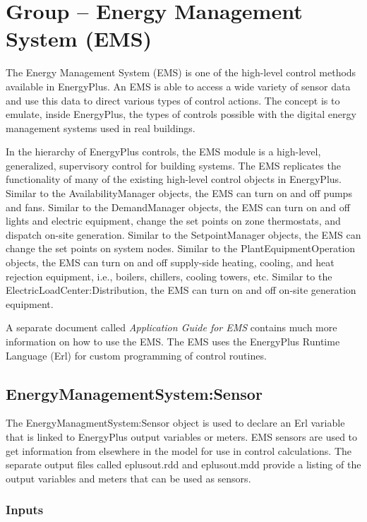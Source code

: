 \section{Group -- Energy Management System (EMS)}\label{group-energy-management-system-ems}

The Energy Management System (EMS) is one of the high-level control methods available in EnergyPlus. An EMS is able to access a wide variety of sensor data and use this data to direct various types of control actions. The concept is to emulate, inside EnergyPlus, the types of controls possible with the digital energy management systems used in real buildings.

In the hierarchy of EnergyPlus controls, the EMS module is a high-level, generalized, supervisory control for building systems. The EMS replicates the functionality of many of the existing high-level control objects in EnergyPlus. Similar to the AvailabilityManager objects, the EMS can turn on and off pumps and fans. Similar to the DemandManager objects, the EMS can turn on and off lights and electric equipment, change the set points on zone thermostats, and dispatch on-site generation. Similar to the SetpointManager objects, the EMS can change the set points on system nodes. Similar to the PlantEquipmentOperation objects, the EMS can turn on and off supply-side heating, cooling, and heat rejection equipment, i.e., boilers, chillers, cooling towers, etc. Similar to the ElectricLoadCenter:Distribution, the EMS can turn on and off on-site generation equipment.

A separate document called \emph{Application Guide for EMS} contains much more information on how to use the EMS. The EMS uses the EnergyPlus Runtime Language (Erl) for custom programming of control routines.

\subsection{EnergyManagementSystem:Sensor}\label{energymanagementsystemsensor}

The EnergyManagmentSystem:Sensor object is used to declare an Erl variable that is linked to EnergyPlus output variables or meters. EMS sensors are used to get information from elsewhere in the model for use in control calculations. The separate output files called eplusout.rdd and eplusout.mdd provide a listing of the output variables and meters that can be used as sensors.

\subsubsection{Inputs}\label{inputs-015}

